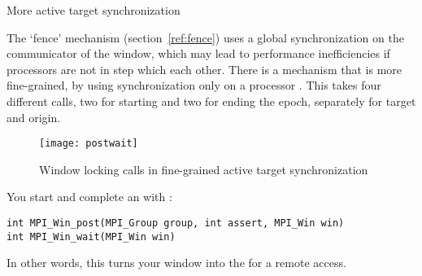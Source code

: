 \begin{comment}
  \begin{itemize}
  \item \indexmpishow{MPI_MODE_NOCHECK}: this is used with
    \indexmpishow{MPI_Win_start} and \indexmpishow{MPI_Win_post}; it
    indicates that when the origin `start' call is made, the target
    `post' call has already been issued. This is comparable to using
    \indexmpishow{MPI_Rsend}.
  \item \indexmpishow{MPI_MODE_NOSTORE}: this is used to specify that
    the local window was not updated in the preceding epoch.
  \item \indexmpishow{MPI_MODE_NOPUT}: this is used to specify that a local
    window will not be used as target in this epoch.
  \item \indexmpishow{MPI_MODE_NOPRECEDE}: this states that the
    \indexmpishow{MPI_Win_fence} call does not conclude a sequence of
    RMA operations. If this assertion is made on any process in a window group,
    it must be specified by all.
  \item \indexmpishow{MPI_MODE_NOSUCCEED}: this states that the
    \indexmpishow{MPI_Win_fence} call is not the start of a sequence of
    local RMA calls. If any process in a window group specifies this,
    all process must do so.
  \end{itemize}
\end{comment}

 {More active target synchronization}

The `fence' mechanism (section~\ref{ref:fence}) uses a global synchronization on the
communicator of the window, which may 
lead to performance inefficiencies if processors are not in step which each other. 
There is a mechanism that is more fine-grained, by using synchronization only 
on a processor . This takes four different calls, two for starting
and two for ending the epoch, separately for target and origin.
\begin{figure}[ht]
  \texttt{[image: postwait]}
  \caption{Window locking calls in fine-grained active target synchronization}
  \label{fig:postwait}
\end{figure}

You start and complete an  with%
:
\begin{verbatim}
int MPI_Win_post(MPI_Group group, int assert, MPI_Win win)
int MPI_Win_wait(MPI_Win win)
\end{verbatim}
In other words, this turns your window into the  for a remote access.

